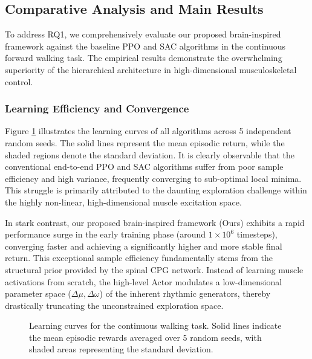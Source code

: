 \documentclass[lettersize,journal]{IEEEtran}
\begin{document}
\subsection{Comparative Analysis and Main Results}
\label{sec:main_results}

To address RQ1, we comprehensively evaluate our proposed brain-inspired framework against the baseline PPO and SAC algorithms in the continuous forward walking task. The empirical results demonstrate the overwhelming superiority of the hierarchical architecture in high-dimensional musculoskeletal control.

\subsubsection{Learning Efficiency and Convergence}
Figure \ref{fig:learning_curve} illustrates the learning curves of all algorithms across 5 independent random seeds. 
The solid lines represent the mean episodic return, while the shaded regions denote the standard deviation. 
It is clearly observable that the conventional end-to-end PPO and SAC algorithms suffer from poor sample efficiency and high variance, frequently converging to sub-optimal local minima. 
This struggle is primarily attributed to the daunting exploration challenge within the highly non-linear, high-dimensional muscle excitation space.

In stark contrast, our proposed brain-inspired framework (Ours) exhibits a rapid performance surge in the early training phase (around $1 \times 10^6$ timesteps), converging faster and achieving a significantly higher and more stable final return. 
This exceptional sample efficiency fundamentally stems from the structural prior provided by the spinal CPG network. 
Instead of learning muscle activations from scratch, the high-level Actor modulates a low-dimensional parameter space ($\Delta \mu, \Delta \omega$) of the inherent rhythmic generators, thereby drastically truncating the unconstrained exploration space.

\begin{figure}[htbp]
    \centering
    \caption{Learning curves for the continuous walking task. Solid lines indicate the mean episodic rewards averaged over 5 random seeds, with shaded areas representing the standard deviation.}
    \label{fig:learning_curve}
\end{figure}
\end{document}
